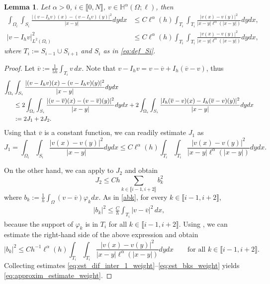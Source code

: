 \documentclass[10 pt]{article}
\newcommand\inter[1]{\llbracket #1\rrbracket}
\newtheorem{lemma}[theorem]{Lemma}
\numberwithin{equation}{section}
\newcommand{\weH}[1]{\mathbb H^{#1}(\Omega;\ell)}
\begin{document}
\begin{lemma}\label{lem:stab_dif_interp_weight}
Let $\alpha>0$, $i\in\inter{0,N}$, $v\in \weH{\alpha}$, then
\begin{align}
    \int_{\Omega_i}\int_{S_i}\frac{|(v-I_h v)(x)-(v-I_h v)(y)|^2}{|x-y|}dy dx &\leq C  \ell^{\alpha}(h)\int_{T_i}\int_{T_{i}}\frac{|v(x)-v(y)|^2}{|x-y|\ell^{\alpha}(|x-y|)}dy dx, \label{eq:approxim_estimate_weight}\\
    |v-I_h v|_{L^2(\Omega_i)}^2&\leq C\ell^{\alpha}(h)\int_{T_{i}}\int_{T_{i}}\frac{|v(x)-v(y)|^2}{|x-y|\ell^{\alpha}(|x-y|)}dy dx,\label{a4}
\end{align}
where $T_i:=S_{i-1}\cup S_{i+1}$ and $S_i$ as in \eqref{eq:def_Si}.
\end{lemma}
%
\begin{proof}
Let $\overline{v}:=\frac{1}{5h}\int_{T_{i}} v\, dx$. Note that $v-I_h v=v-\overline{v}+I_h(\overline v - v)$, thus
%
\begin{align}\notag
    \int_{\Omega_i}&\int_{S_i}\frac{|(v-I_h v)(x)-(v-I_h v)(y)|^2}{|x-y|} dy dx \\ \notag
    &\leq 2\int_{\Omega_i}\int_{S_i}\frac{|(v-\overline{v})(x)-(v-\overline{v})(y)|^2}{|x-y|}dy dx + 2 \int_{\Omega_i}\int_{S_i}\frac{|I_h(\overline v-{v})(x)-I_h(\overline v-{v})(y)|^2}{|x-y|}dy dx \\ \label{eq:est_dif_inter_1_weight}
    &:=2J_1+2J_2.
\end{align}
%
Using that $\overline v$ is a constant function, we can readily estimate $J_1$ as
%
\begin{equation}\label{eq:est_J1_weight}
    J_1 = \int_{\Omega_i}\int_{S_i}\frac{|v(x)-v(y)|^2}{|x-y|}dy dx \leq C\ell^{\alpha}(h)\int_{T_i}\int_{T_i}\frac{|v(x)-v(y)|^2}{|x-y|\ell^{\alpha}(|x-y|)}dy dx.
\end{equation}

On the other hand, we can apply  to $J_2$ and obtain
%
\begin{equation}\label{eq:est_J2_weight}
    J_2 \leq Ch\sum_{k\in \inter{i-1,i+2}} b_k^2
\end{equation}
%
where $b_k:=\frac{1}{h}\int_{\Omega}(v-\overline v)\varphi_k dx$. As in \eqref{abk}, for every $k\in \inter{i-1,i+2}$,
\begin{align*}
    |b_k|^2\leq \frac{C}{h}\int_{T_{i}}|v-\overline{v}|^2\, dx,
\end{align*}
because the support of $\varphi_k$ is in $T_{i}$ for all $k\in \inter{i-1,i+2}$. Using , we can estimate the right-hand side of the above expression and obtain
%
\begin{equation}\label{eq:est_bks_weight}
    |b_k|^2\leq Ch^{-1}\ell^{\alpha}(h)\int_{T_{i}}\int_{T_{i}}\frac{|v(x)-v(y)|^2}{|x-y|\ell^{\alpha}(|x-y|)}dy dx\qquad \text{for all $k\in \inter{i-1,i+2}$}.
\end{equation}
%
Collecting estimates \eqref{eq:est_dif_inter_1_weight}--\eqref{eq:est_bks_weight} yields \eqref{eq:approxim_estimate_weight}. 


\end{proof}
\end{document}
